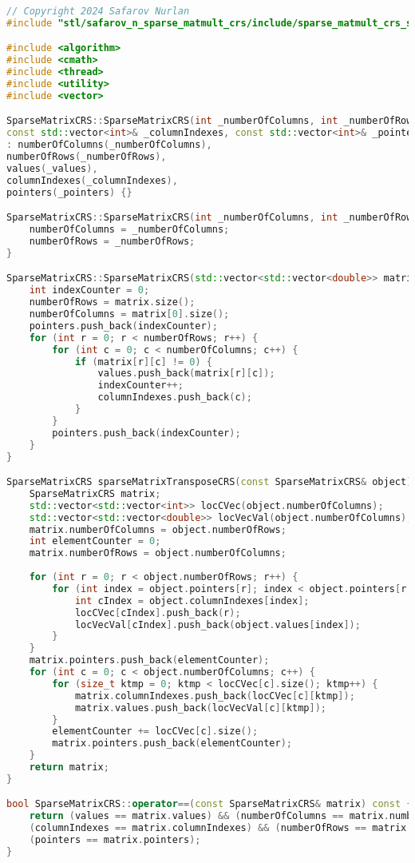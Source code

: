 \documentclass[a4paper, 14pt]{article}
\theoremstyle{plain}
\begin{document}
\begin{lstlisting}[language=C++,caption=Файл sparse\_matmult\_crs\_stl.cpp]
// Copyright 2024 Safarov Nurlan
#include "stl/safarov_n_sparse_matmult_crs/include/sparse_matmult_crs_stl.hpp"

#include <algorithm>
#include <cmath>
#include <thread>
#include <utility>
#include <vector>

SparseMatrixCRS::SparseMatrixCRS(int _numberOfColumns, int _numberOfRows, const std::vector<double>& _values,
const std::vector<int>& _columnIndexes, const std::vector<int>& _pointers)
: numberOfColumns(_numberOfColumns),
numberOfRows(_numberOfRows),
values(_values),
columnIndexes(_columnIndexes),
pointers(_pointers) {}

SparseMatrixCRS::SparseMatrixCRS(int _numberOfColumns, int _numberOfRows) {
	numberOfColumns = _numberOfColumns;
	numberOfRows = _numberOfRows;
}

SparseMatrixCRS::SparseMatrixCRS(std::vector<std::vector<double>> matrix) {
	int indexCounter = 0;
	numberOfRows = matrix.size();
	numberOfColumns = matrix[0].size();
	pointers.push_back(indexCounter);
	for (int r = 0; r < numberOfRows; r++) {
		for (int c = 0; c < numberOfColumns; c++) {
			if (matrix[r][c] != 0) {
				values.push_back(matrix[r][c]);
				indexCounter++;
				columnIndexes.push_back(c);
			}
		}
		pointers.push_back(indexCounter);
	}
}

SparseMatrixCRS sparseMatrixTransposeCRS(const SparseMatrixCRS& object) {
	SparseMatrixCRS matrix;
	std::vector<std::vector<int>> locCVec(object.numberOfColumns);
	std::vector<std::vector<double>> locVecVal(object.numberOfColumns);
	matrix.numberOfColumns = object.numberOfRows;
	int elementCounter = 0;
	matrix.numberOfRows = object.numberOfColumns;
	
	for (int r = 0; r < object.numberOfRows; r++) {
		for (int index = object.pointers[r]; index < object.pointers[r + 1]; index++) {
			int cIndex = object.columnIndexes[index];
			locCVec[cIndex].push_back(r);
			locVecVal[cIndex].push_back(object.values[index]);
		}
	}
	matrix.pointers.push_back(elementCounter);
	for (int c = 0; c < object.numberOfColumns; c++) {
		for (size_t ktmp = 0; ktmp < locCVec[c].size(); ktmp++) {
			matrix.columnIndexes.push_back(locCVec[c][ktmp]);
			matrix.values.push_back(locVecVal[c][ktmp]);
		}
		elementCounter += locCVec[c].size();
		matrix.pointers.push_back(elementCounter);
	}
	return matrix;
}

bool SparseMatrixCRS::operator==(const SparseMatrixCRS& matrix) const {
	return (values == matrix.values) && (numberOfColumns == matrix.numberOfColumns) &&
	(columnIndexes == matrix.columnIndexes) && (numberOfRows == matrix.numberOfRows) &&
	(pointers == matrix.pointers);
}


\end{lstlisting}
\end{document}
